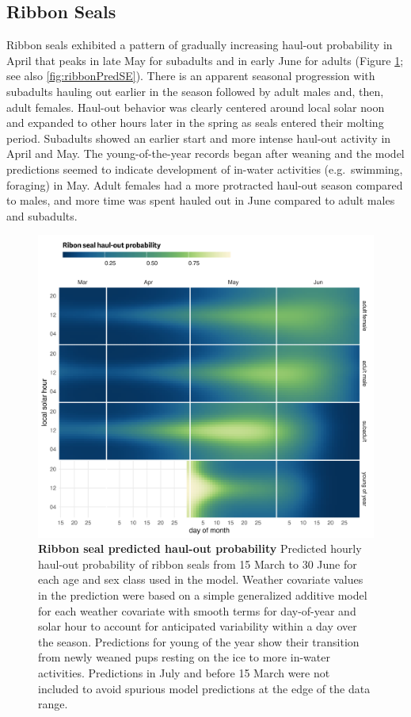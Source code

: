 \documentclass[fleqn,10pt,lineno]{wlpeerj} %
\begin{document}
\subsection*{Ribbon Seals}\label{ribbon-seals}

Ribbon seals exhibited a pattern of gradually increasing haul-out probability in
April that peaks in late May for subadults and in early June for adults (Figure
\ref{fig:ribbonHOCal}; see also \ref{fig:ribbonPredSE}). There is an apparent
seasonal progression with subadults hauling out earlier in the season followed
by adult males and, then, adult females. Haul-out behavior was clearly centered
around local solar noon and expanded to other hours later in the spring as seals
entered their molting period. Subadults showed an earlier start and more intense
haul-out activity in April and May. The young-of-the-year records began after
weaning and the model predictions seemed to indicate development of in-water
activities (e.g.~swimming, foraging) in May. Adult females had a more protracted
haul-out season compared to males, and more time was spent hauled out in June
compared to adult males and subadults.



\begin{figure}
\includegraphics[width=1\linewidth]{../figures/Figure-007} \caption{\textbf{Ribbon seal predicted haul-out probability} \linebreak Predicted hourly haul-out probability of ribbon seals from 15 March to 30 June for each age and sex class used in the model. Weather covariate values in the prediction were based on a simple generalized additive model for each weather covariate with smooth terms for day-of-year and solar hour to account for anticipated variability within a day over the season. Predictions for young of the year show their transition from newly weaned pups resting on the ice to more in-water activities. Predictions in July and before 15 March were not included to avoid spurious model predictions at the edge of the data range.}\label{fig:ribbonHOCal}
\end{figure}
\end{document}
